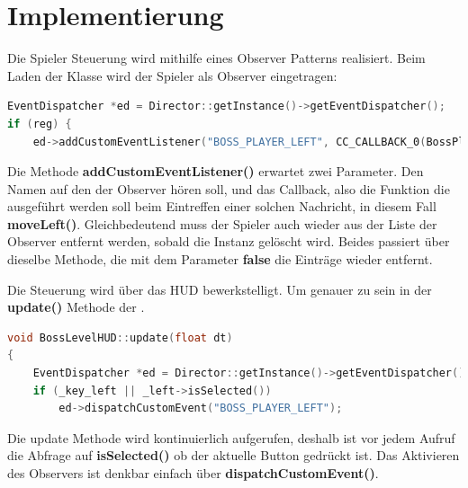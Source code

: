 \chapter{Implementierung}\label{ch:impl}

\label{sec:4_SpielerSteuerung}

Die Spieler Steuerung wird mithilfe eines Observer Patterns realisiert. Beim Laden der  Klasse wird der Spieler als Observer eingetragen:

\begin{lstlisting}[label=lst:player_control_observer,
				   language=C++,
				   firstnumber=103,
				   caption=BossPlayer als Observer eintragen ( BossPlayer.cpp )]
EventDispatcher *ed = Director::getInstance()->getEventDispatcher();
if (reg) {
	ed->addCustomEventListener("BOSS_PLAYER_LEFT", CC_CALLBACK_0(BossPlayer::moveLeft, this));
\end{lstlisting}

Die Methode \textbf{addCustomEventListener()} erwartet zwei Parameter. Den Namen auf den der Observer hören soll, und das Callback, also die Funktion die ausgeführt werden soll beim Eintreffen einer solchen Nachricht, in diesem Fall \textbf{moveLeft()}. 
Gleichbedeutend muss der Spieler auch wieder aus der Liste der Observer entfernt werden, sobald die Instanz gelöscht wird. Beides passiert über dieselbe Methode, die mit dem Parameter \textbf{false} die Einträge wieder entfernt.

Die Steuerung wird über das HUD bewerkstelligt. Um genauer zu sein in der \textbf{update()} Methode der .

\begin{lstlisting}[label=lst:player_control_push_msg,
				   language=C++,
				   firstnumber=181,
				   caption=Drücken des Laufen-Buttons ( BossLevelHUD.cpp )]
void BossLevelHUD::update(float dt)
{
	EventDispatcher *ed = Director::getInstance()->getEventDispatcher();
	if (_key_left || _left->isSelected())
		ed->dispatchCustomEvent("BOSS_PLAYER_LEFT");
\end{lstlisting}

Die update Methode wird kontinuierlich aufgerufen, deshalb ist vor jedem Aufruf die Abfrage auf \textbf{isSelected()} ob der aktuelle Button gedrückt ist. Das Aktivieren des Observers ist denkbar einfach über \textbf{dispatchCustomEvent()}.




